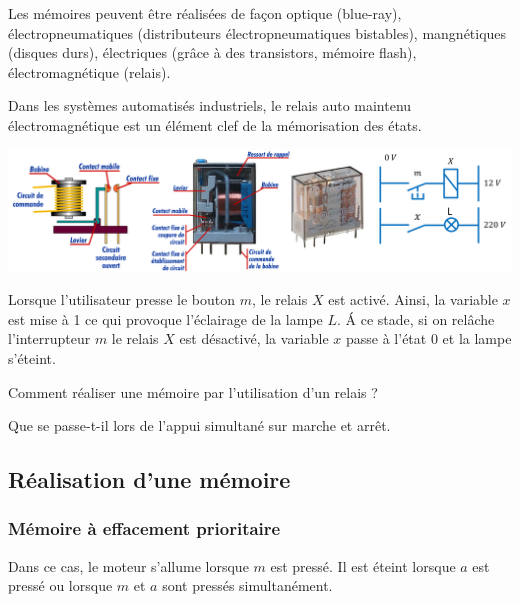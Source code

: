 \documentclass[10pt,fleqn]{article} %
\begin{document}
 Les mémoires peuvent être réalisées de façon optique (blue-ray), électropneumatiques (distributeurs électropneumatiques bistables), mangnétiques (disques durs), électriques (grâce à des transistors, mémoire flash), électromagnétique (relais). 
 
 Dans les systèmes automatisés industriels, le relais auto maintenu électromagnétique est un élément clef de la mémorisation des états. 

\begin{center}
\includegraphics[width=\textwidth]{images/relais}
\end{center}

Lorsque l'utilisateur presse le bouton $m$, le relais $X$ est activé. Ainsi, la variable $x$ est mise à 1 ce qui provoque l'éclairage de la lampe $L$. \'A ce stade, si on relâche l'interrupteur $m$ le relais $X$ est désactivé, la variable $x$ passe à l'état 0 et la lampe s'éteint.

\begin{obj}
Comment réaliser une mémoire par l'utilisation d'un relais ? 

Que se passe-t-il lors de l'appui simultané sur marche et arrêt. 
\end{obj}

\subsection{Réalisation d'une mémoire}
\subsubsection{Mémoire à effacement prioritaire}
Dans ce cas, le moteur s'allume lorsque $m$ est pressé. Il est éteint lorsque $a$ est pressé ou lorsque $m$ et $a$ sont pressés simultanément.
 
\end{document}
